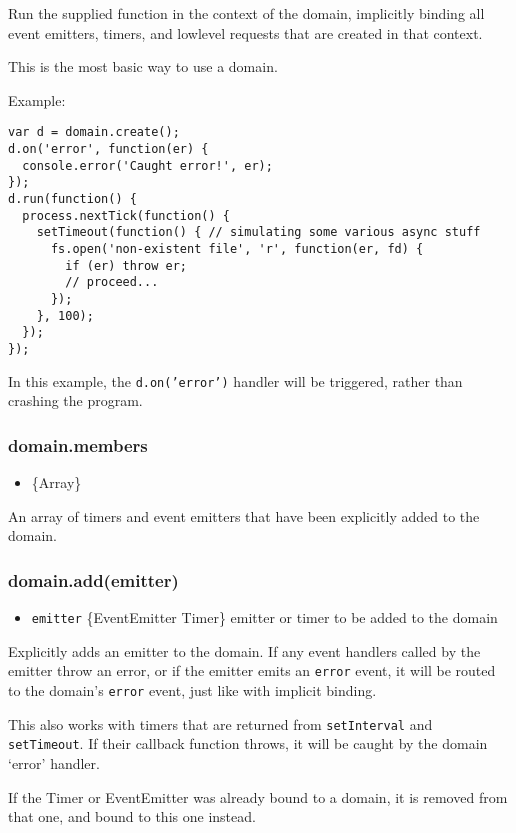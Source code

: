 Run the supplied function in the context of the domain, implicitly
binding all event emitters, timers, and lowlevel requests that are
created in that context.

This is the most basic way to use a domain.

Example:

\begin{verbatim}
var d = domain.create();
d.on('error', function(er) {
  console.error('Caught error!', er);
});
d.run(function() {
  process.nextTick(function() {
    setTimeout(function() { // simulating some various async stuff
      fs.open('non-existent file', 'r', function(er, fd) {
        if (er) throw er;
        // proceed...
      });
    }, 100);
  });
});
\end{verbatim}

In this example, the \texttt{d.on('error')} handler will be triggered,
rather than crashing the program.

\subsubsection{domain.members}

\begin{itemize}
\item
  \{Array\}
\end{itemize}

An array of timers and event emitters that have been explicitly added to
the domain.

\subsubsection{domain.add(emitter)}

\begin{itemize}
\item
  \texttt{emitter} \{EventEmitter \textbar{} Timer\} emitter or timer to
  be added to the domain
\end{itemize}

Explicitly adds an emitter to the domain. If any event handlers called
by the emitter throw an error, or if the emitter emits an \texttt{error}
event, it will be routed to the domain's \texttt{error} event, just like
with implicit binding.

This also works with timers that are returned from \texttt{setInterval}
and \texttt{setTimeout}. If their callback function throws, it will be
caught by the domain `error' handler.

If the Timer or EventEmitter was already bound to a domain, it is
removed from that one, and bound to this one instead.

